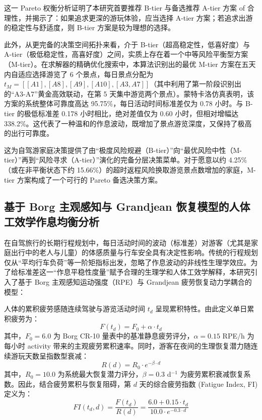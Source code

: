\documentclass{cumcmthesis}
\begin{document}
这一 Pareto 权衡分析证明了本研究首要推荐 B-tier 与备选推荐 A-tier 方案 of 合理性，并揭示了：如果追求更深的游玩体验，应当选择 A-tier 方案；若追求出游的稳定性与舒适度，则 B-tier 方案是较为理想的选择。

此外，从更完备的决策空间拓扑来看，介于 B-tier（超高稳定性，低喜好度）与 A-tier（极低稳定性，高喜好度）之间，实质上存在着一个中等风险平衡型方案（M-tier）。在求解器的精确优化搜索中，本算法识别出的最优 M-tier 方案在五天内自适应选择游览了 6 个景点，每日景点分配为 $t_M = [ [A1], [A8], [A9], [A10], [A3, A7] ]$（其中利用了第一阶段识别出的“A3-A7”黄金高效联动，在第 5 天集中游览两个景点）。蒙特卡洛仿真表明，该方案的系统整体可靠度高达 95.75\%，每日活动时间标准差仅为 0.78 小时。与 B-tier 的极低标准差 0.178 小时相比，绝对差值仅为 0.60 小时，但相对增幅达 338.2\%。这代表了一种温和的作息波动，既增加了景点游览深度，又保持了极高的出行可靠度。

这为自驾游家庭决策提供了由“极度风险规避（B-tier）”向“最优风险中性（M-tier）”再到“风险寻求（A-tier）”演化的完备分层决策菜单。对于愿意以约 4.25\%（或在非平衡状态下约 15.66\%）的超时返程风险换取游览景点数增加的家庭，M-tier 方案构成了一个可行的 Pareto 备选决策方案。

\subsection{基于 Borg 主观感知与 Grandjean 恢复模型的人体工效学作息均衡分析}
在自驾旅行的长期行程规划中，每日活动时间的波动（标准差）对游客（尤其是家庭出行中的老人与儿童）的体感质量与行车安全具有决定性影响。传统的行程规划仅从“平均行车负荷”等一阶矩指标出发，忽略了作息波动的非线性生理学效应。为了给标准差这一“作息平稳性度量”赋予合理的生理学和人体工效学解释，本研究引入了基于 Borg 主观感知运动强度（RPE）与 Grandjean 疲劳恢复动力学耦合的模型\cite{ref21}：

人体的累积疲劳感随连续驾驶与游览活动时间 $t_d$ 呈现累积特性。由此定义单日累积疲劳为：
\begin{equation}
F(t_d) = F_0 + \alpha \cdot t_d
\end{equation}
其中，$F_0 = 6.0$ 为 Borg CR-10 量表中的基准静息疲劳评分，$\alpha = 0.15$ RPE/h 为每小时 activity 带来的主观疲劳累积速率。同时，游客在夜间的生理恢复潜力随连续游玩天数呈指数型衰减：
\begin{equation}
R(d) = R_0 \cdot e^{-\beta \cdot d}
\end{equation}
其中，$R_0 = 10.0$ 为系统最大恢复潜力评分，$\beta = 0.3$ d$^{-1}$ 为疲劳累积衰减恢复系数。因此，结合疲劳累积与恢复阻碍，第 $d$ 天的综合疲劳指数 (Fatigue Index, FI) 定义为：
\begin{equation}
FI(t_d, d) = \frac{F(t_d)}{R(d)} = \frac{6.0 + 0.15 \cdot t_d}{10.0 \cdot e^{-0.3 \cdot d}}
\end{equation}
\end{document}
